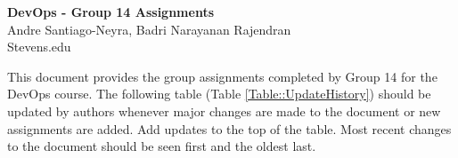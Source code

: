 \newpage
\thispagestyle{empty}
\begin{center}
    {\Large\bfseries DevOps - Group 14 Assignments}\\
    \vspace{0.5cm}
    Andre Santiago-Neyra, Badri Narayanan Rajendran\\
    Stevens.edu
\end{center}

\vspace{1cm}

This document provides the group assignments completed by Group 14 for the DevOps course. The following table (Table \ref{Table::UpdateHistory}) should be updated by authors whenever major changes are made to the document or new assignments are added. Add updates to the top of the table. Most recent changes to the document should be seen first and the oldest last.

\vspace{1cm}

